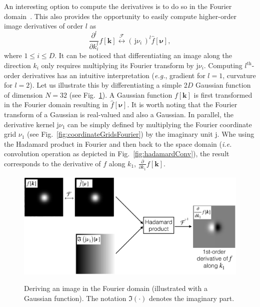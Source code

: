 \documentclass[fleqn,a4paper,oneside,openany]{book}
\begin{document}
An interesting option to compute the derivatives is to do so in the Fourier domain~\cite{DeF2017}.
This also provides the opportunity to easily compute higher-order image derivatives of order $l$ as
%
\begin{equation}\label{eq:FourierDerivative}
\frac{\partial^l}{\partial k_i^l} f[\boldsymbol{k}] \overset{\mathcal{F}}{\longleftrightarrow} (\,\mathrm{j}\nu_i\,)^l \hat{f}[\boldsymbol{\nu}],
\end{equation}
%
where $1\leq i \leq D$.
It can be noticed that differentiating an image along the direction $k_i$ only requires multiplying its Fourier transform by $\mathrm{j}\nu_i$.
Computing $l^{\text{th}}$-order derivatives has an intuitive interpretation (\emph{e.g.}, gradient for $l=1$, curvature for $l=2$).
Let us illustrate this by differentiating a simple 2$D$ Gaussian function of dimension $N=32$ (see Fig.~\ref{fig:GaussianDerivative}).
A Gaussian function $f[\boldsymbol{k}]$ is first transformed in the Fourier domain resulting in $\hat{f}[\boldsymbol{\nu}]$. It is worth noting that the Fourier transform of a Gaussian is real-valued and also a Gaussian.
In parallel, the derivative kernel $\mathrm{j}\nu_1$ can be simply defined by multiplying the Fourier coordinate grid $\nu_1$ (see Fig.~\ref{fig:coordinateGridsFourier}) by the imaginary unit $\mathrm{j}$.
Whe using the Hadamard product in Fourier and then back to the space domain (\emph{i.e.} convolution operation as depicted in Fig.~\ref{fig:hadamardConv}), the result corresponds to the derivative of $f$ along $k_1$, $\frac{\partial}{\partial k_1} f[\boldsymbol{k}]$.
%
\begin{figure}
\centering
\includegraphics[trim = 0 0 0 0, clip, width=1\linewidth]{GaussianDerivative.png}\\
\caption{Deriving an image in the Fourier domain (illustrated with a Gaussian function). The notation $\Im(\cdot)$ denotes the imaginary part.}
  \label{fig:GaussianDerivative}
\end{figure}
%
\end{document}
